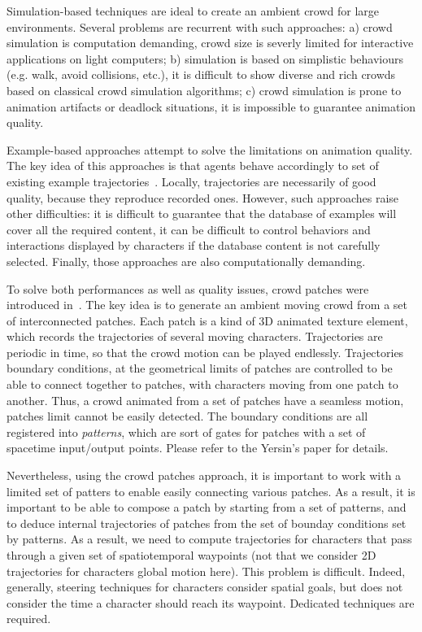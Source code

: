 \documentclass[conference]{acmsiggraph}
\begin{document}
Simulation-based techniques are ideal to create an ambient crowd for large environments. Several problems are recurrent with such approaches: a) crowd simulation is computation demanding, crowd size is severly limited for interactive applications on light computers; b) simulation is based on simplistic behaviours (e.g. walk, avoid collisions, etc.), it is difficult to show diverse and rich crowds based on classical crowd simulation algorithms; c) crowd simulation is prone to animation artifacts or deadlock situations, it is impossible to guarantee animation quality. 

Example-based approaches attempt to solve the limitations on animation quality. The key idea of this approaches is that agents behave accordingly to set of existing example trajectories~\cite{Lerner:2007,Ju:2010,Charalambous:2014}. Locally, trajectories are necessarily of good quality, because they reproduce recorded ones. However, such approaches raise other difficulties: it is difficult to guarantee that the database of examples will cover all the required content, it can be difficult to control behaviors and interactions displayed by characters if the database content is not carefully selected. Finally, those approaches are also computationally demanding.

To solve both performances as well as quality issues, crowd patches were introduced in~\cite{Yersin:2009}. The key idea is to generate an ambient moving crowd from a set of interconnected patches. Each patch is a kind of 3D animated texture element, which records the trajectories of several moving characters. Trajectories are periodic in time, so that the crowd motion can be played endlessly. Trajectories boundary conditions, at the geometrical limits of patches are controlled to be able to connect together to patches, with characters moving from one patch to another. Thus, a crowd animated from a set of patches have a seamless motion, patches limit cannot be easily detected. The boundary conditions are all registered into {\it patterns}, which are sort of gates for patches with a set of spacetime input/output points. Please refer to the Yersin's paper for details. 

Nevertheless, using the crowd patches approach, it is important to work with a limited set of patters to enable easily connecting various patches. As a result, it is important to be able to compose a patch by starting from a set of patterns, and to deduce internal trajectories of patches from the set of bounday conditions set by patterns. As a result, we need to compute trajectories for characters that pass through a given set of spatiotemporal waypoints (not that we consider 2D trajectories for characters global motion here). This problem is difficult. Indeed, generally, steering techniques for characters consider spatial goals, but does not consider the time a character should reach its waypoint. Dedicated techniques are required. 
\end{document}
